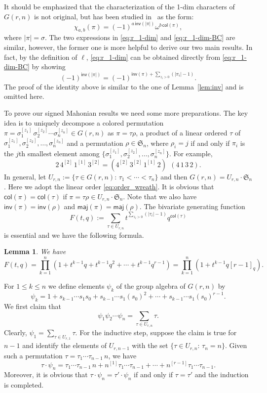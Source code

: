 \documentclass[a4paper, reqno, 11pt]{amsart}
\newtheorem{lem}{Lemma}[section]
\newcommand{\maj}{{\textsf{maj}}}
\newcommand{\inv}{{\textsf{inv}}}
\newcommand{\col}{{\textsf{col}}}
\numberwithin{equation}{section}
\def\proof{\noindent{\bf Proof.\quad}}
\begin{document}
It should be emphasized that the characterization of the 1-dim characters of $G(r,n)$ is not original, but has been studied in~\cite{Biagioli_Caselli_12} as the form:
\begin{equation}\label{eq:r_1-dim-BC}
\chi_{a,b}(\pi)=(-1)^{a\,\inv(|\pi|)}\omega^{b\,\col(\pi)},
\end{equation}
where $|\pi|=\sigma$.
The two expressions in \eqref{eq:r_1-dim} and \eqref{eq:r_1-dim-BC} are similar, however, the former one is more helpful to derive our two main results.
In fact, by the definition of $\ell$, \eqref{eq:r_1-dim} can be obtained directly from \eqref{eq:r_1-dim-BC} by showing
\begin{equation}\label{eq:r_1-dim-connection}
(-1)^{\inv(|\pi|)} = (-1)^{\inv(\pi)+\sum_{z_i>0}(|\pi_i|-1)}.
\end{equation}
The proof of the identity above is similar to the one of Lemma~\ref{lem:inv} and is omitted here.



To prove our signed Mahonian results we need some more preparations.
The key idea is to uniquely decompose a colored permutation $\pi=\sigma_1^{[z_1]}\,\sigma_2^{[z_2]}\cdots\sigma_n^{[z_n]}\in G(r,n)$ as $\pi=\tau\rho$, a product of a linear ordered $\tau$ of $\sigma_1^{[z_1]},\sigma_2^{[z_2]},\ldots,\sigma_n^{[z_n]}$ and a permutation $\rho\in \mathfrak{S}_n$, where $\rho_i=j$ if and only if $\pi_i$ is the $j$th smallest element among $\{\sigma_1^{[z_1]},\sigma_2^{[z_2]},\ldots,\sigma_n^{[z_n]}\}$.
For example, $$2\,4^{[2]}\,1^{[1]}\,3^{[2]}=(4^{[2]}\,3^{[2]}\,1^{[1]}\,2)~~(4\,1\,3\,2).$$
In general, let $U_{r,n}:=\{\tau\in G(r,n):\,\tau_1<\cdots<\tau_n\}$ and then $G(r,n)=U_{r,n}\cdot \mathfrak{S}_n$.
Here we adopt the linear order \eqref{eq:order_wreath}.
It is obvious that $\col(\pi)=\col(\tau)$ if $\pi=\tau\rho\in U_{r,n}\cdot \mathfrak{S}_n$. 
Note that we also have $\inv(\pi)=\inv(\rho)$ and $\maj(\pi)=\maj(\rho)$. 
The bivariate generating function
$$F(t,q):=\sum_{\tau\in U_{r,n}} t^{\sum_{z_i>0}(|\tau_i|-1)}q^{\col(\tau)}$$
is essential and we have the following formula.

\begin{lem}\label{lem:r_bivariate} We have
$$F(t,q)=\prod_{k=1}^{n}(1+t^{k-1}q+t^{k-1}q^2+\cdots+t^{k-1}q^{r-1})=\prod_{k=1}^{n}(1+t^{k-1}q[r-1]_q).$$
\end{lem}
\proof
For $1\leq k\leq n$ we define elements $\psi_k$ of the group algebra of $G(r,n)$ by
$$\psi_k=1+s_{k-1}\cdots s_1s_0+s_{k-1}\cdots s_1(s_0)^2+\cdots+s_{k-1}\cdots s_1(s_0)^{r-1}.$$
We first claim that
$$\psi_1\psi_2\cdots\psi_n=\sum_{\tau\in U_{r,n}}\tau.$$
Clearly, $\psi_1=\sum_{\tau\in U_{r,1}}\tau$.
For the inductive step, suppose the claim is true for $n-1$ and identify the elements of $U_{r,n-1}$ with the set $\{\tau\in U_{r,n}:\,\tau_n=n\}$. 
Given such a permutation $\tau=\tau_1\cdots\tau_{n-1}\,n$, we have
\begin{equation}\label{eq:psi_algebra}
\tau\cdot\psi_n=\tau_1\cdots\tau_{n-1}\,n+n^{[1]}\tau_1\cdots\tau_{n-1}+\cdots+n^{[r-1]}\tau_1\cdots\tau_{n-1}.
\end{equation}
Moreover, it is obvious that $\tau\cdot\psi_n=\tau'\cdot\psi_n$ if and only if $\tau=\tau'$ and the induction is completed.
\end{document}
